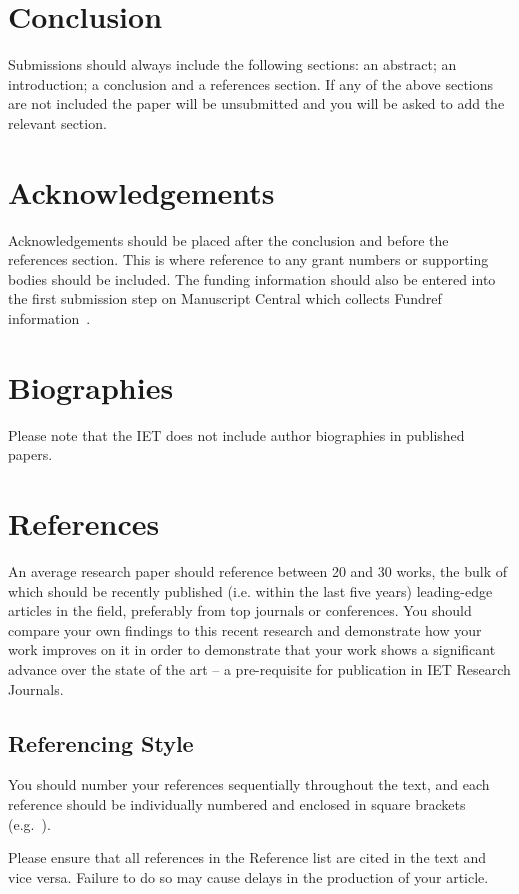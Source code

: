 \documentclass{ietperso}
\begin{document}
\begin{ietbody}
\section{Conclusion}
Submissions should always include the following sections: an abstract; an introduction; a conclusion and a references section. If any of the above sections are not included the paper will be unsubmitted and you will be asked to add the relevant section. 

\section{Acknowledgements}
Acknowledgements should be placed after the conclusion and before the references section. This is where reference to any grant numbers or supporting bodies should be included. The funding information should also be entered into the first submission step on Manuscript Central which collects Fundref information~\cite{author_2015_fundref}.

\section{Biographies}
Please note that the IET does not include author biographies in published papers.

\section{References}
An average research paper should reference between 20 and 30 works, the bulk of which should be recently published (i.e. within the last five years) leading-edge articles in the field, preferably from top journals or conferences. You should compare your own findings to this recent research and demonstrate how your work improves on it in order to demonstrate that your work shows a significant advance over the state of the art – a pre-requisite for publication in IET Research Journals.

\subsection{Referencing Style}
You should number your references sequentially throughout the text, and each reference should be individually numbered and enclosed in square brackets (e.g.~\cite{author_2015_guide}).

Please ensure that all references in the Reference list are cited in the text and vice versa. Failure to do so may cause delays in the production of your article.


\end{ietbody}
\end{document}
